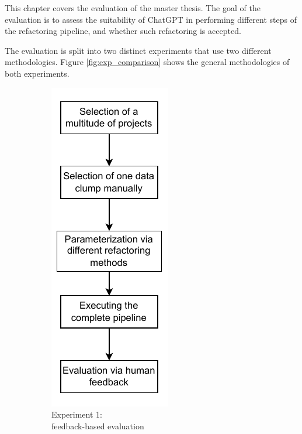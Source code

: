 This chapter covers the evaluation of the master thesis. The goal of the evaluation is to assess the suitability of ChatGPT in performing  different steps of the refactoring pipeline, and whether such refactoring is accepted.



The evaluation is split into two distinct experiments that use two different methodologies. Figure \ref{fig:exp_comparison} shows the general methodologies of both experiments. 

\begin{figure}[ht!]
    \centering
   \begin{subfigure}[t]{0.49\columnwidth}
   \centering
    \includegraphics[]{figures/chapter5/evalPartASequence.drawio.pdf}
    \caption{Experiment 1:\\
    feedback-based evaluation}
    \label{fig:exp1_sequence}
    \end{subfigure}
     \begin{subfigure}[t]{0.49\columnwidth}
     \centering

\end{subfigure}
\end{figure}
